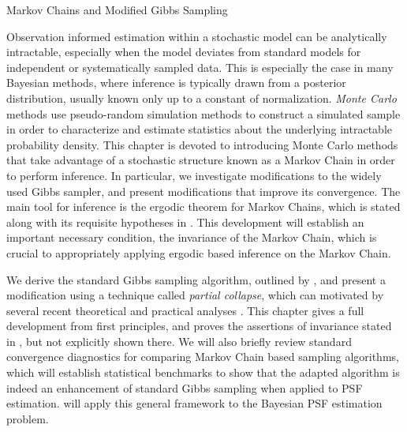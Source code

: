 \setlength{\parindent}{2ex}
\newcommand{\Ab}{{\bf A}}
\newcommand{\N}{\mathcal{N}}
\begin{chapter}{Markov Chains and Modified Gibbs Sampling}\label{chapter:mcmctheory}

Observation informed estimation within a stochastic model can be analytically intractable, especially when the model deviates from standard models for independent or systematically sampled data.
This is especially the case in many Bayesian methods, where inference is typically drawn from a posterior distribution, usually known only up to a constant of normalization.
\emph{Monte Carlo} methods use pseudo-random simulation methods to construct a simulated sample in order to characterize and estimate statistics about the underlying intractable probability density.
This chapter is devoted to introducing Monte Carlo methods that take advantage of a stochastic structure known as a Markov Chain in order to perform inference.
In particular, we investigate modifications to the widely used Gibbs sampler, and present modifications that improve its convergence.
The main tool for inference is the ergodic theorem for Markov Chains, which is stated along with its requisite hypotheses in .
This development will establish an important necessary condition, the invariance of the Markov Chain, which is crucial to appropriately applying ergodic based inference on the Markov Chain.

We derive the standard Gibbs sampling algorithm, outlined by \citep{geman1984stochastic}, and present a modification using a technique called \emph{partial collapse}, which can motivated by several recent theoretical and practical analyses \citep{van2008partially,agapiou2014analysis,fox2015fast}.
This chapter gives a full development from first principles, and proves the assertions of invariance stated in \citep{van2008partially}, but not explicitly shown there.
We will also briefly review standard convergence diagnostics for comparing Markov Chain based sampling algorithms, which will establish statistical benchmarks to show that the adapted algorithm is indeed an enhancement of standard Gibbs sampling when applied to PSF estimation.  
 will apply this general framework to the Bayesian PSF estimation problem.


\end{chapter}
